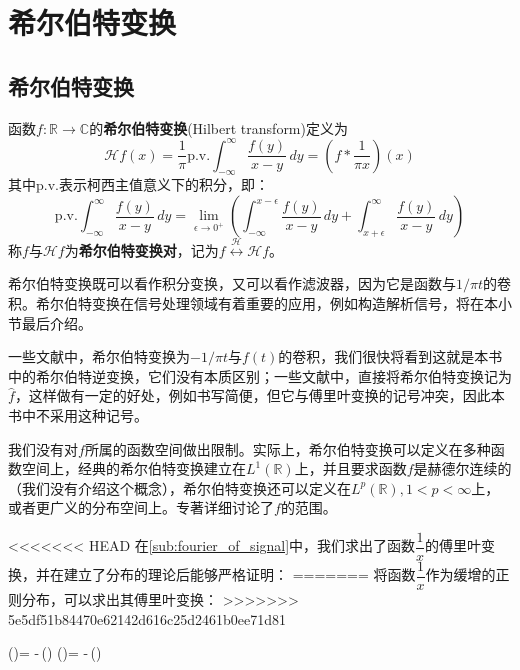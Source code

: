 \section{希尔伯特变换}\label{sec:Hilbert}

\subsection{希尔伯特变换}\label{sub:hilbert}

\begin{definition}[希尔伯特变换]
    函数$f:\mathbb{R}\to\mathbb{C}$的\textbf{希尔伯特变换}(Hilbert transform)定义为
    \[\mathcal{H} f(x)=\frac{1}{\pi}\text{p.v.}\int_{-\infty}^{\infty}\frac{f(y)}{x-y}\,dy=\left(f*\frac{1}{\pi x}\right)(x)\]
    其中p.v.表示柯西主值意义下的积分\cite{hilbert_transform}，即：
    \[\text{p.v.}\int_{-\infty}^{\infty}\frac{f(y)}{x-y}\,dy=\lim_{\epsilon\to 0^+}\left(\int_{-\infty}^{x-\epsilon}\frac{f(y)}{x-y}\,dy+\int_{x+\epsilon}^{\infty}\frac{f(y)}{x-y}\,dy\right)\]
    称$f$与$\mathcal{H} f$为\textbf{希尔伯特变换对}，记为$f\overset{\mathcal{H} }{\longleftrightarrow} \mathcal{H} f$。
\end{definition}

希尔伯特变换既可以看作积分变换，又可以看作滤波器，因为它是函数与$1/\pi t$的卷积。希尔伯特变换在信号处理领域有着重要的应用，例如构造解析信号，将在本小节最后介绍。

\begin{remark}
    一些文献中\cite{brad_osgood_ee261}，希尔伯特变换为$-1/\pi t$与$f(t)$的卷积，我们很快将看到这就是本书中的希尔伯特逆变换，它们没有本质区别；一些文献中\cite{signal_systems}，直接将希尔伯特变换记为$\hat{f}$，这样做有一定的好处，例如书写简便，但它与傅里叶变换的记号冲突，因此本书中不采用这种记号。
\end{remark}
\begin{remark}
    我们没有对$f$所属的函数空间做出限制。实际上，希尔伯特变换可以定义在多种函数空间上，经典的希尔伯特变换建立在$L^1(\mathbb{R})$上，并且要求函数$f$是赫德尔连续的（我们没有介绍这个概念），希尔伯特变换还可以定义在$L^p(\mathbb{R}),1<p<\infty$上，或者更广义的分布空间上。专著\cite{hilbert_transform}详细讨论了$f$的范围。
\end{remark}

<<<<<<< HEAD
在\ref{sub:fourier_of_signal}中，我们求出了函数$\dfrac{1}{x}$的傅里叶变换，并在建立了分布的理论后能够严格证明：
=======
将函数$\dfrac{1}{x}$作为缓增的正则分布，可以求出其傅里叶变换：
>>>>>>> 5e5df51b84470e62142d616c25d2461b0ee71d81
\begin{lralign}
     (\xi)= -\,(\xi)
    \switch
     (\omega)= -\,(\omega)
\end{lralign}

